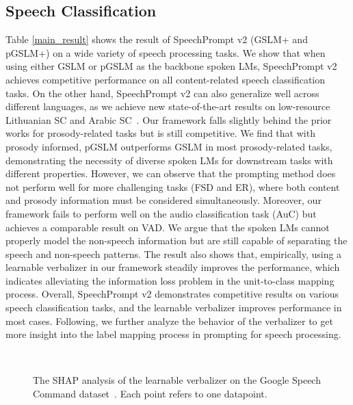 \subsection{Speech Classification}
Table \ref{main_result} shows the result of SpeechPrompt v2 (GSLM+ and pGSLM+) on a wide variety of speech processing tasks. 
We show that when using either GSLM or pGSLM as the backbone spoken LMs, SpeechPrompt v2 achieves competitive performance on all content-related speech classification tasks. 
On the other hand, SpeechPrompt v2 can also generalize well across different languages, as we achieve new state-of-the-art results on low-resource Lithuanian SC and Arabic SC~\cite{DBLP:journals/corr/abs-2110-03894}.
Our framework falls slightly behind the prior works for prosody-related tasks but is still competitive. We find that with prosody informed, pGSLM outperforms GSLM in most prosody-related tasks, demonstrating the necessity of diverse spoken LMs for downstream tasks with different properties.
However, we can observe that the prompting method does not perform well for more challenging tasks (FSD and ER), where both content and prosody information must be considered simultaneously.
Moreover, our framework fails to perform well on the audio classification task (AuC) but achieves a comparable result on VAD. We argue that the spoken LMs cannot properly model the non-speech information but are still capable of separating the speech and non-speech patterns.
The result also shows that, empirically, using a learnable verbalizer in our framework steadily improves the performance, which indicates alleviating the information loss problem in the unit-to-class mapping process.
Overall, SpeechPrompt v2 demonstrates competitive results on various speech classification tasks, and the learnable verbalizer improves performance in most cases. Following, we further analyze the behavior of the verbalizer to get more insight into the label mapping process in prompting for speech processing.

\

\begin{figure}[t]
    \centering
    
    \caption{The SHAP analysis of the learnable verbalizer on the Google Speech Command dataset~\cite{vygon2021learning}. Each point refers to one datapoint.} \label{fig:analyzing_verbalizer}
    \vspace{-15pt}
\end{figure}

